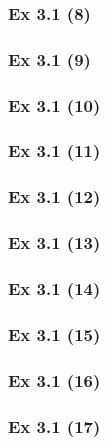 \subsubsection{Ex 3.1 (8)}\label{sec:Ex_3.1.8}

\subsubsection{Ex 3.1 (9)}\label{sec:Ex_3.1.9}

\subsubsection{Ex 3.1 (10)}\label{sec:Ex_3.1.10}

\newpage		%

\subsubsection{Ex 3.1 (11)}\label{sec:Ex_3.1.11}

\subsubsection{Ex 3.1 (12)}\label{sec:Ex_3.1.12}

\subsubsection{Ex 3.1 (13)}\label{sec:Ex_3.1.13}

\subsubsection{Ex 3.1 (14)}\label{sec:Ex_3.1.14}

\subsubsection{Ex 3.1 (15)}\label{sec:Ex_3.1.15}

\subsubsection{Ex 3.1 (16)}\label{sec:Ex_3.1.16}

\subsubsection{Ex 3.1 (17)}\label{sec:Ex_3.1.17}

